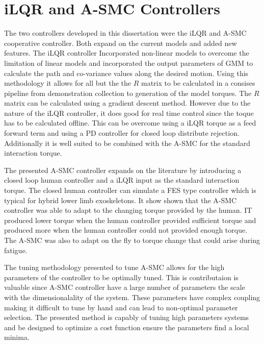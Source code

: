 \section{iLQR and A-SMC Controllers}

The two controllers developed in this dissertation were the iLQR and A-SMC cooperative controller. Both expand on the current models and added new features. The iLQR controller Incorporated non-linear models to overcome the limitation of linear models and incorporated the output parameters of GMM to calculate the path and co-variance values along the desired motion. Using this methodology it allows for all but the the $R$ matrix to be calculated in a consises pipeline from demonstration collection to generation of the model torques. The $R$ matrix can be calculated using a gradient descent method. However due to the nature of the iLQR controller, it does good for real time control since the toque has to be calculated offline. This can be overcome using a iLQR torque as a feed forward term and using a PD controller for closed loop distribute rejection.  Additionally it is well suited to be combined with the A-SMC for the standard interaction torque. 

The presented A-SMC controller expands on the literature by introducing a closed loop human controller and a iLQR input as the standard interaction torque. The closed human controller can simulate a FES type controller which is typical for hybrid lower limb exoskeletons. It show shown that the A-SMC controller was able to adapt to the changing torque provided by the human. IT produced lower torque when the human controller provided sufficient torque and  produced more when the human controller could not provided enough torque. The A-SMC was also to adapt on the fly to torque change that could arise during fatigue. 

The tuning methodology presented to tune A-SMC allows for the high parameters of the controller to be optimally tuned. This is contributaion is valuable since A-SMC controller have a large number of parameters the scale with the dimensionalality of the system. These parameters have complex coupling making it difficult to tune by hand and can lead to non-optimal parameter selection. The presented method is capably of tuning high parameters systems and be designed to optimize a cost function ensure the parameters find a local minima. 

